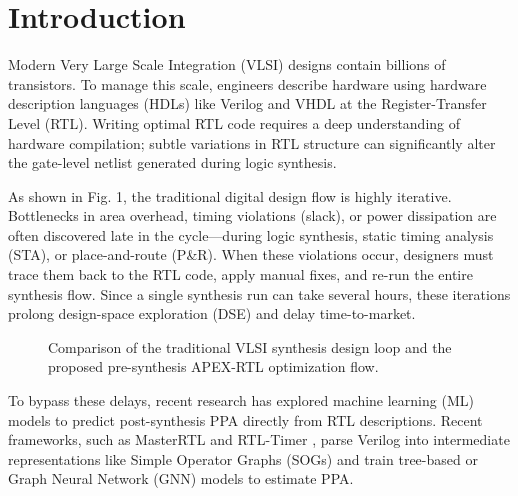 \documentclass[conference]{IEEEtran}
\begin{document}
\section{Introduction}
Modern Very Large Scale Integration (VLSI) designs contain billions of transistors. To manage this scale, engineers describe hardware using hardware description languages (HDLs) like Verilog and VHDL at the Register-Transfer Level (RTL). Writing optimal RTL code requires a deep understanding of hardware compilation; subtle variations in RTL structure can significantly alter the gate-level netlist generated during logic synthesis. 

As shown in Fig. 1, the traditional digital design flow is highly iterative. Bottlenecks in area overhead, timing violations (slack), or power dissipation are often discovered late in the cycle---during logic synthesis, static timing analysis (STA), or place-and-route (P\&R). When these violations occur, designers must trace them back to the RTL code, apply manual fixes, and re-run the entire synthesis flow. Since a single synthesis run can take several hours, these iterations prolong design-space exploration (DSE) and delay time-to-market.

\begin{figure}[t]
\centering
{}
\caption{Comparison of the traditional VLSI synthesis design loop and the proposed pre-synthesis APEX-RTL optimization flow.}
\label{fig:design_flow}
\end{figure}

To bypass these delays, recent research has explored machine learning (ML) models to predict post-synthesis PPA directly from RTL descriptions. Recent frameworks, such as MasterRTL \cite{xie2023master} and RTL-Timer \cite{rtltimer}, parse Verilog into intermediate representations like Simple Operator Graphs (SOGs) and train tree-based or Graph Neural Network (GNN) models to estimate PPA.
\end{document}
